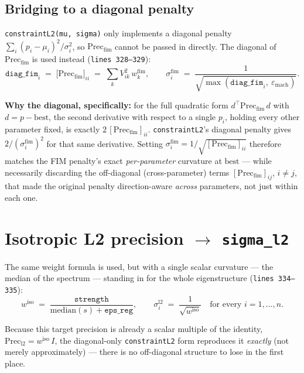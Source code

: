 \documentclass[11pt]{article}
\newcommand{\code}[1]{\texttt{#1}}
\newcommand{\file}[1]{\textcolor{black!60}{\texttt{#1}}}
\begin{document}
\subsection*{Bridging to a diagonal penalty}

\code{constraintL2(mu, sigma)} only implements a diagonal penalty
$\sum_i (p_i-\mu_i)^2/\sigma_i^2$, so $\mathrm{Prec}_{\mathrm{fim}}$ cannot be
passed in directly. The diagonal of $\mathrm{Prec}_{\mathrm{fim}}$ is used
instead (\file{lines 328--329}):
\begin{equation}
  \texttt{diag\_fim}_i \;=\; \big[\mathrm{Prec}_{\mathrm{fim}}\big]_{ii}
  \;=\; \sum_{k} V_{ik}^2\, w^{\mathrm{fim}}_k,
  \qquad
  \sigma^{\mathrm{fim}}_i \;=\; \frac{1}{\sqrt{\max(\texttt{diag\_fim}_i,\ \varepsilon_{\mathrm{mach}})}}.
\end{equation}

\textbf{Why the diagonal, specifically:} for the full quadratic form
$d^\top \mathrm{Prec}_{\mathrm{fim}}\, d$ with $d = p-\mathrm{best}$, the
second derivative with respect to a single $p_i$, holding every other
parameter fixed, is exactly $2\,[\mathrm{Prec}_{\mathrm{fim}}]_{ii}$.
\code{constraintL2}'s diagonal penalty gives $2/(\sigma_i^{\mathrm{fim}})^2$
for that same derivative. Setting
$\sigma^{\mathrm{fim}}_i = 1/\sqrt{[\mathrm{Prec}_{\mathrm{fim}}]_{ii}}$
therefore matches the FIM penalty's exact \emph{per-parameter} curvature at
$\mathrm{best}$ --- while necessarily discarding the off-diagonal
(cross-parameter) terms $[\mathrm{Prec}_{\mathrm{fim}}]_{ij}$, $i\neq j$, that
made the original penalty direction-aware \emph{across} parameters, not just
within each one.

\section{Isotropic L2 precision $\to$ \code{sigma\_l2}}

The same weight formula is used, but with a single scalar curvature ---
the median of the spectrum --- standing in for the whole eigenstructure
(\file{lines 334--335}):
\begin{equation}
  w^{\mathrm{iso}} \;=\; \frac{\texttt{strength}}{\mathrm{median}(s) + \texttt{eps\_reg}},
  \qquad
  \sigma^{\mathrm{l2}}_i \;=\; \frac{1}{\sqrt{w^{\mathrm{iso}}}}
  \quad\text{for every } i=1,\ldots,n.
\end{equation}

Because this target precision is already a scalar multiple of the identity,
$\mathrm{Prec}_{\mathrm{l2}} = w^{\mathrm{iso}}\, I$, the diagonal-only
\code{constraintL2} form reproduces it \emph{exactly} (not merely
approximately) --- there is no off-diagonal structure to lose in the first
place.
\end{document}
